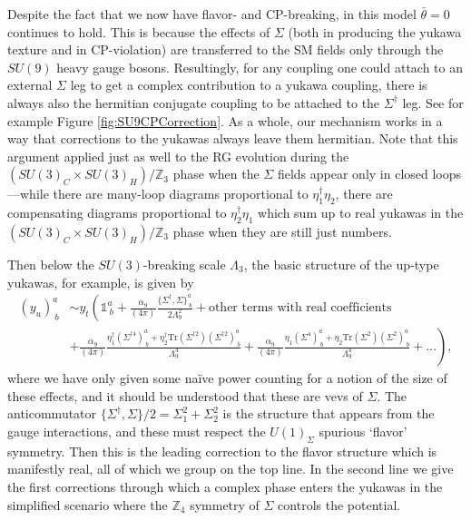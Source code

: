 \documentclass[11pt,a4paper]{article}
\newcommand{\sutt}{\left(SU(3)_C \times SU(3)_H\right)/\mathbb{Z}_3}
\begin{document}
Despite the fact that we now have flavor- and CP-breaking, in this model $\bar \theta = 0$ continues to hold. This is because the effects of $\Sigma$ (both in producing the yukawa texture and in CP-violation) are transferred to the SM fields only through the $SU(9)$ heavy gauge bosons.
Resultingly, for any coupling one could attach to an external $\Sigma$ leg to get a complex contribution to a yukawa coupling, there is always also the hermitian conjugate coupling to be attached to the $\Sigma^\dagger$ leg. See for example Figure \ref{fig:SU9CPCorrection}. 
As a whole, our mechanism works in a way that corrections to the yukawas always leave them hermitian. Note that this argument applied just as well to the RG evolution during the $\sutt$ phase when the $\Sigma$ fields appear only in closed loops---while there are many-loop diagrams proportional to $\eta_1^\dagger \eta_2$, there are compensating diagrams proportional to $\eta_2^\dagger \eta_1$ which sum up to real yukawas in the $\sutt$ phase when they are still just numbers.

Then below the $SU(3)$-breaking scale $\Lambda_3$, the basic structure of the up-type yukawas, for example, is given by
\begin{align}
    (y_u)^a_{\ b} &\sim y_t \left(\mathds{1}^a_{\ b} + \frac{\alpha_9}{(4\pi)} \frac{\lbrace \Sigma^\dagger, \Sigma \rbrace^a_{\ b}}{2 \Lambda_9^2} + \text{other terms with real coefficients}\right. \\
    &\left. + \frac{\alpha_9} {(4\pi)}\frac{\eta_1^\dagger (\Sigma^{\dagger 4})^a_{\ b} + \eta_2^\dagger \text{Tr}(\Sigma^{\dagger 2}) (\Sigma^{\dagger 2})^a_{\ b}}{\Lambda_9^4} + \frac{\alpha_9} {(4\pi)}\frac{\eta_1 (\Sigma^{4})^a_{\ b} + \eta_2 \text{Tr}(\Sigma^{ 2}) (\Sigma^{ 2})^a_{\ b}}{\Lambda_9^4} + \dots \right), \nonumber
\end{align}
where we have only given some na\"{i}ve power counting for a notion of the size of these effects, and it should be understood that these are vevs of $\Sigma$. 
The anticommutator $\lbrace \Sigma^\dagger, \Sigma \rbrace/2 = \Sigma_1^2 + \Sigma_2^2$ is the structure that appears from the gauge interactions, and these must respect the $U(1)_{\Sigma}$ spurious `flavor' symmetry. Then this is the leading correction to the flavor structure which is manifestly real, all of which we group on the top line. 
In the second line we give the first corrections through which a complex phase enters the yukawas in the simplified scenario where the $\mathbb{Z}_4$ symmetry of $\Sigma$ controls the potential. 
\end{document}
